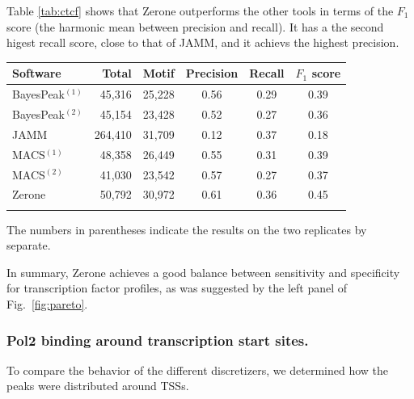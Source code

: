 \documentclass{bioinfo}
\begin{document}
Table \ref{tab:ctcf} shows that Zerone outperforms the other tools
in terms of the $F_1$ score (the harmonic mean between precision and
recall). It has a the second higest recall score, close to that of JAMM,
and it achievs the highest precision.

\begin{table}[!t]
{\begin{tabular}{lrrccc}
        \toprule
        \textbf{Software}  & \textbf{Total}  & \textbf{Motif} &
        \textbf{Precision} & \textbf{Recall} & \textbf{$F_{1}$ score} \\
        \midrule
        BayesPeak$^{(1)}$ &  45,316 & 25,228 & 0.56 & 0.29 & 0.39 \\
        BayesPeak$^{(2)}$ &  45,154 & 23,428 & 0.52 & 0.27 & 0.36 \\
        JAMM              & 264,410 & 31,709 & 0.12 & 0.37 & 0.18 \\
        MACS$^{(1)}$      &  48,358 & 26,449 & 0.55 & 0.31 & 0.39 \\
        MACS$^{(2)}$      &  41,030 & 23,542 & 0.57 & 0.27 & 0.37 \\
        Zerone            &  50,792 & 30,972 & 0.61 & 0.36 & 0.45 \\
        \botrule
\end{tabular}}{The numbers in parentheses indicate the results on the two
replicates by separate.}
\end{table}

In summary, Zerone achieves a good balance between sensitivity and
specificity for transcription factor profiles, as was suggested by
the left panel of Fig.~\ref{fig:pareto}.


\subsubsection{Pol2 binding around transcription start sites.}
To compare the behavior of the different discretizers, we determined how the
peaks were distributed around TSSs.
\end{document}
